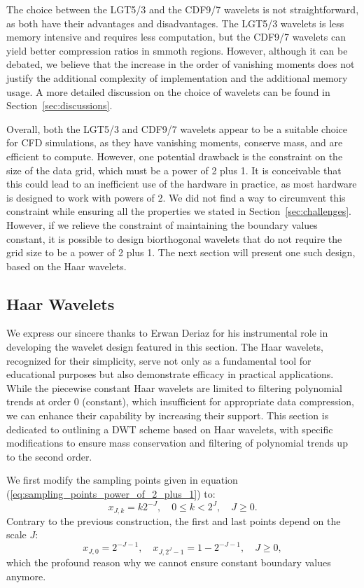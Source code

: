 The choice between the LGT5/3 and the CDF9/7 wavelets is not straightforward, as both have their advantages and disadvantages.
The LGT5/3 wavelets is less memory intensive and requires less computation, but the CDF9/7 wavelets can yield better compression ratios in smmoth regions.
However, although it can be debated, we believe that the increase in the order of vanishing moments does not justify the additional complexity of implementation and the additional memory usage.
A more detailed discussion on the choice of wavelets can be found in Section~\ref{sec:discussions}.

Overall, both the LGT5/3 and CDF9/7 wavelets appear to be a suitable choice for CFD simulations, as they have vanishing moments, conserve mass, and are efficient to compute.
However, one potential drawback is the constraint on the size of the data grid, which must be a power of 2 plus 1.
It is conceivable that this could lead to an inefficient use of the hardware in practice, as most hardware is designed to work with powers of 2.
We did not find a way to circumvent this constraint while ensuring all the properties we stated in Section~\ref{sec:challenges}.
However, if we relieve the constraint of maintaining the boundary values constant, it is possible to design biorthogonal wavelets that do not require the grid size to be a power of 2 plus 1.
The next section will present one such design, based on the Haar wavelets.

\subsection{Haar Wavelets} \label{sec:haar_wavelets}


We express our sincere thanks to Erwan Deriaz for his instrumental role in developing the wavelet design featured in this section.
The Haar wavelets, recognized for their simplicity, serve not only as a fundamental tool for educational purposes but also demonstrate efficacy in practical applications.
While the piecewise constant Haar wavelets are limited to filtering polynomial trends at order 0 (constant), which insufficient for appropriate data compression, we can enhance their capability by increasing their support.
This section is dedicated to outlining a DWT scheme based on Haar wavelets, with specific modifications to ensure mass conservation and filtering of polynomial trends up to the second order.

We first modify the sampling points given in equation (\ref{eq:sampling_points_power_of_2_plus_1}) to:
\begin{equation}
x_{J,k}=k2^{-J},\quad0\leq k<2^{J},\quad J\geq0.
\end{equation}
Contrary to the previous construction, the first and last points depend on the scale \( J \):
\begin{equation}
x_{J,0}=2^{-J-1},\quad x_{J,2^{J}-1}=1-2^{-J-1},\quad J\geq0,
\end{equation}
which the profound reason why we cannot ensure constant boundary values anymore.

